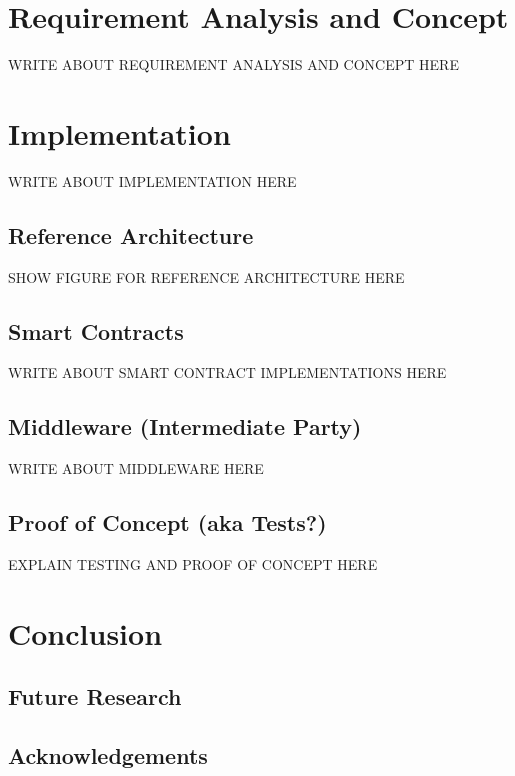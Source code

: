 \chapter{Requirement Analysis and Concept}
\label{ch:chapter03}
WRITE ABOUT REQUIREMENT ANALYSIS AND CONCEPT HERE

\chapter{Implementation}
\label{ch:chapter04}
WRITE ABOUT IMPLEMENTATION HERE

\section{Reference Architecture}
\label{sec:chapter04:ref_architecture}

SHOW FIGURE FOR REFERENCE ARCHITECTURE HERE
%
%
\section{Smart Contracts}
\label{sec:chapter04:smartcontracts}
WRITE ABOUT SMART CONTRACT IMPLEMENTATIONS HERE

\section{Middleware (Intermediate Party)}
\label{sec:chapter04:middleware}
WRITE ABOUT MIDDLEWARE HERE

\section{Proof of Concept (aka Tests?)}
\label{sec:chapter04:poc}
EXPLAIN TESTING AND PROOF OF CONCEPT HERE

\chapter{Conclusion}
\label{ch:chapter05}

\section{Future Research}
\label{sec:background:futureresearch}

\section{Acknowledgements}
\label{sec:background:acknowledgements}


